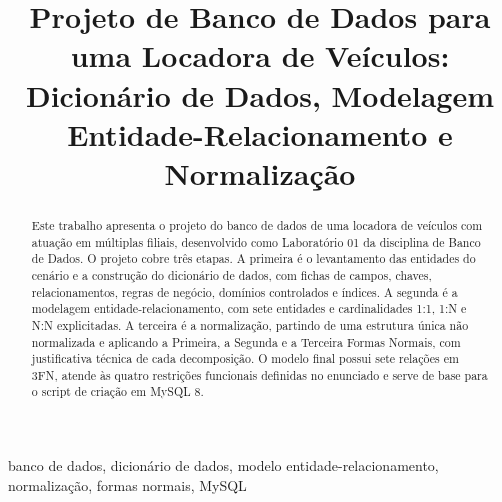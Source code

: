 \documentclass[conference,a4paper,10pt]{IEEEtran}
\begin{document}
\title{Projeto de Banco de Dados para uma Locadora de Ve\'iculos:\\ Dicion\'ario de Dados, Modelagem Entidade-Relacionamento e Normaliza\c{c}\~ao}

\author{
\and
{}
\and
{}
}

\maketitle

\begin{abstract}
Este trabalho apresenta o projeto do banco de dados de uma locadora de ve\'iculos com atua\c{c}\~ao em m\'ultiplas filiais, desenvolvido como Laborat\'orio 01 da disciplina de Banco de Dados. O projeto cobre tr\^es etapas. A primeira \'e o levantamento das entidades do cen\'ario e a constru\c{c}\~ao do dicion\'ario de dados, com fichas de campos, chaves, relacionamentos, regras de neg\'ocio, dom\'inios controlados e \'indices. A segunda \'e a modelagem entidade-relacionamento, com sete entidades e cardinalidades 1:1, 1:N e N:N explicitadas. A terceira \'e a normaliza\c{c}\~ao, partindo de uma estrutura \'unica n\~ao normalizada e aplicando a Primeira, a Segunda e a Terceira Formas Normais, com justificativa t\'ecnica de cada decomposi\c{c}\~ao. O modelo final possui sete rela\c{c}\~oes em 3FN, atende \`as quatro restri\c{c}\~oes funcionais definidas no enunciado e serve de base para o script de cria\c{c}\~ao em MySQL 8.
\end{abstract}

\begin{IEEEkeywords}
banco de dados, dicion\'ario de dados, modelo entidade-relacionamento, normaliza\c{c}\~ao, formas normais, MySQL
\end{IEEEkeywords}
\end{document}
